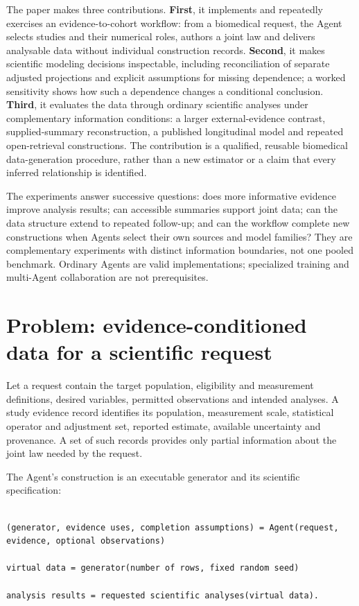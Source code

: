 \documentclass[10pt,twocolumn]{article}
\begin{document}
The paper makes three contributions. \textbf{First}, it implements and repeatedly exercises an evidence-to-cohort workflow: from a biomedical request, the Agent selects studies and their numerical roles, authors a joint law and delivers analysable data without individual construction records. \textbf{Second}, it makes scientific modeling decisions inspectable, including reconciliation of separate adjusted projections and explicit assumptions for missing dependence; a worked sensitivity shows how such a dependence changes a conditional conclusion. \textbf{Third}, it evaluates the data through ordinary scientific analyses under complementary information conditions: a larger external-evidence contrast, supplied-summary reconstruction, a published longitudinal model and repeated open-retrieval constructions. The contribution is a qualified, reusable biomedical data-generation procedure, rather than a new estimator or a claim that every inferred relationship is identified.


The experiments answer successive questions: does more informative evidence improve analysis results; can accessible summaries support joint data; can the data structure extend to repeated follow-up; and can the workflow complete new constructions when Agents select their own sources and model families? They are complementary experiments with distinct information boundaries, not one pooled benchmark. Ordinary Agents are valid implementations; specialized training and multi-Agent collaboration are not prerequisites.


\section{Problem: evidence-conditioned data for a scientific request}

Let a request contain the target population, eligibility and measurement definitions, desired variables, permitted observations and intended analyses. A study evidence record identifies its population, measurement scale, statistical operator and adjustment set, reported estimate, available uncertainty and provenance. A set of such records provides only partial information about the joint law needed by the request.


The Agent's construction is an executable generator and its scientific specification:


\begin{lstlisting}

(generator, evidence uses, completion assumptions) = Agent(request, evidence, optional observations)

virtual data = generator(number of rows, fixed random seed)

analysis results = requested scientific analyses(virtual data).

\end{lstlisting}
\end{document}
